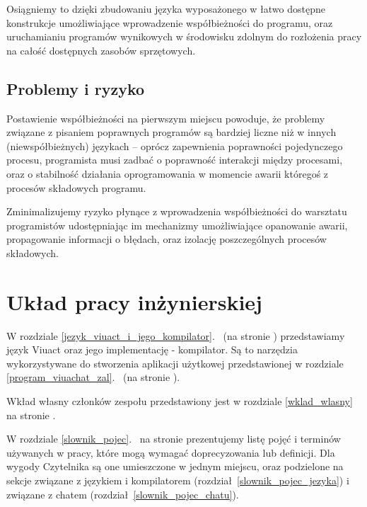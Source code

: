 Osiągniemy to dzięki zbudowaniu języka wyposażonego w łatwo dostępne konstrukcje umożliwiające wprowadzenie
współbieżności do programu, oraz uruchamianiu programów wynikowych w środowisku zdolnym do rozłożenia pracy na
całość dostępnych zasobów sprzętowych.

\subsection{Problemy i ryzyko}

Postawienie współbieżności na pierwszym miejscu powoduje, że problemy związane z pisaniem poprawnych programów
są bardziej liczne niż w innych (niewspółbieżnych) językach -- oprócz zapewnienia poprawności pojedynczego
procesu, programista musi zadbać o poprawność interakcji między procesami, oraz o stabilność działania
oprogramowania w momencie awarii któregoś z procesów składowych programu.

Zminimalizujemy ryzyko płynące z wprowadzenia współbieżności do warsztatu programistów udostępniając im
mechanizmy umożliwiające opanowanie awarii, propagowanie informacji o błędach, oraz izolację poszczególnych
procesów składowych.

\section{Układ pracy inżynierskiej}

W rozdziale \ref{jezyk_viuact_i_jego_kompilator}.~ (na stronie
\pageref{jezyk_viuact_i_jego_kompilator}) przedstawiamy język Viuact oraz jego implementację - kompilator.
Są to narzędzia wykorzystywane do stworzenia aplikacji użytkowej przedstawionej w rozdziale
\ref{program_viuachat_zal}.~ (na stronie \pageref{program_viuachat_zal}).

Wkład własny członków zespołu przedstawiony jest w rozdziale \ref{wklad_wlasny} na stronie
\pageref{wklad_wlasny}.

W rozdziale \ref{slownik_pojec}.~ na stronie \pageref{slownik_pojec} prezentujemy listę
pojęć i terminów używanych w pracy, które mogą wymagać doprecyzowania lub definicji. Dla wygody Czytelnika są
one umieszczone w jednym miejscu, oraz podzielone na sekcje związane z językiem i kompilatorem
(rozdział~\ref{slownik_pojec_jezyka}) i związane z chatem (rozdział~\ref{slownik_pojec_chatu}).


